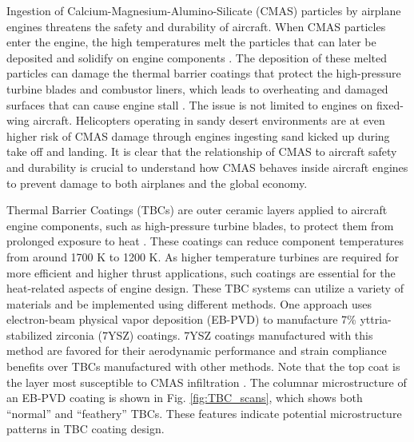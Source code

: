\documentclass[%
 aip,
 amsmath,amssymb,
 reprint,%
]{revtex4-1}
\begin{document}
Ingestion of Calcium-Magnesium-Alumino-Silicate (CMAS) particles by airplane engines threatens the safety and durability of aircraft. 
When CMAS particles enter the engine, the high temperatures melt the particles that can later be deposited and solidify on engine components \cite{Chen2015}. The deposition of these melted particles can damage the thermal barrier coatings that protect the high-pressure turbine blades and combustor liners, which leads to overheating and damaged surfaces that can cause engine stall \cite{Chen2015}. The issue is not limited to engines on fixed-wing aircraft. Helicopters operating in sandy desert environments are at even higher risk of CMAS damage through engines ingesting sand kicked up during take off and landing\cite{Smialek}. 
It is clear that the relationship of CMAS to aircraft safety and durability is crucial to understand how CMAS behaves inside aircraft engines to prevent damage to both airplanes and the global economy.

Thermal Barrier Coatings (TBCs) are outer ceramic layers applied to aircraft engine components, such as high-pressure turbine blades, to protect them from prolonged exposure to heat \cite{Bennett2005}. These coatings can reduce component temperatures \cite{Sirigiri2018} from around 1700 K to 1200 K. As higher temperature turbines are required for more efficient and higher thrust applications, such coatings are essential for the heat-related aspects of engine design. 
These TBC systems can utilize a variety of materials and be implemented using different methods. One approach uses electron-beam physical vapor deposition (EB-PVD) to manufacture 7\% yttria-stabilized zirconia (7YSZ) coatings. 7YSZ coatings manufactured with this method are favored for their aerodynamic performance and strain compliance benefits over TBCs manufactured with other methods. Note that the top coat is the layer most susceptible to CMAS infiltration \cite{Renteria2007}. 
The columnar microstructure of an EB-PVD coating is shown in Fig. \ref{fig:TBC_scans}, which shows both ``normal'' and ``feathery'' TBCs. These features indicate potential microstructure patterns in TBC coating design. 
\end{document}
